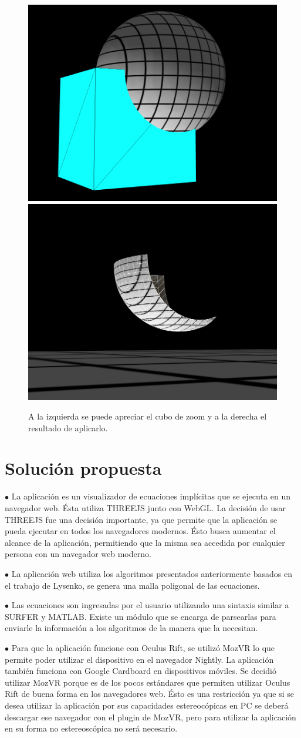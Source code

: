 \documentclass[12pt]{article}
\begin{document}
\begin{figure}[h!]
\includegraphics[width =0.45\linewidth]{cubo1.png}
\hfill
\includegraphics[width =0.45\linewidth]{cubo2.png}
\caption{ A la izquierda se puede apreciar el cubo de zoom y a la derecha el resultado de aplicarlo.}
\label{zoomCube}
\end{figure}
\clearpage

\section{Solución propuesta}
$\bullet$ La aplicación es un visualizador de ecuaciones implícitas que se ejecuta en un navegador web. Ésta utiliza THREEJS junto con WebGL. La decisión de usar THREEJS fue una decisión importante, ya que permite que la aplicación se pueda ejecutar en todos los navegadores modernos. Ésto busca  aumentar el alcance de la aplicación, permitiendo que la misma sea accedida por cualquier persona con un navegador web moderno.

$\bullet$ La aplicación web utiliza los algoritmos presentados anteriormente basados en el trabajo de Lysenko\cite{mykola1}\cite{mykola2}, se genera una malla poligonal de las ecuaciones.  

$\bullet$ Las ecuaciones son ingresadas por el usuario utilizando una sintaxis similar a SURFER y MATLAB. Existe un módulo que se encarga de parsearlas para enviarle la información a los algoritmos de la manera que la necesitan.

$\bullet$ Para que la aplicación funcione con Oculus Rift, se utilizó MozVR lo que permite poder utilizar el dispositivo en el navegador Nightly. La aplicación también funciona con Google Cardboard en dispositivos móviles. Se decidió utilizar MozVR porque es de los pocos estándares que permiten utilizar Oculus Rift de buena forma en los navegadores web. Ésto es una restricción ya que si se desea utilizar la aplicación por sus capacidades estereocópicas en PC se deberá descargar ese navegador con el plugin de MozVR, pero para utilizar la aplicación en su forma no estereoscópica no será necesario.
\end{document}
